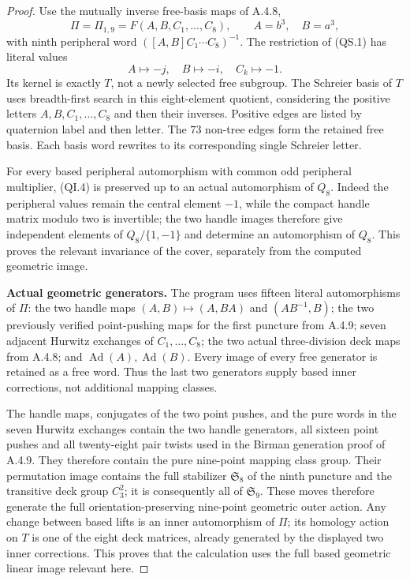 \begin{proof}
Use the mutually inverse free-basis maps of A.4.8,
\[
 \Pi=\Pi_{1,9}=F(A,B,C_1,\ldots,C_8),\qquad
 A=b^3,\quad B=a^3,
\]
with ninth peripheral word
$([A,B]C_1\cdots C_8)^{-1}$.  The restriction of (QS.1)
has literal values
\[
 A\mapsto-j,\quad B\mapsto-i,\quad C_k\mapsto-1.
                                                        \tag{QI.4}
\]
Its kernel is exactly $T$, not a newly selected free
subgroup.  The Schreier basis of $T$ uses breadth-first
search in this eight-element quotient, considering the
positive letters $A,B,C_1,\ldots,C_8$ and then their
inverses.  Positive edges are listed by quaternion label
and then letter.  The $73$ non-tree edges form the retained
free basis.  Each basis word rewrites to its corresponding
single Schreier letter.

For every based peripheral automorphism with common
odd peripheral multiplier, (QI.4) is preserved up to
an actual automorphism of $Q_8$.  Indeed the peripheral
values remain the central element $-1$, while the
compact handle matrix modulo two is invertible; the
two handle images therefore give independent elements
of $Q_8/\{1,-1\}$ and determine an automorphism of
$Q_8$.  This proves the relevant invariance of the
cover, separately from the computed geometric image.

\textbf{Actual geometric generators.}
The program uses fifteen literal automorphisms of $\Pi$:
the two handle maps $(A,B)\mapsto(A,BA)$ and
$(AB^{-1},B)$; the two previously verified point-pushing
maps for the first puncture from A.4.9; seven adjacent
Hurwitz exchanges of $C_1,\ldots,C_8$; the two actual
three-division deck maps from A.4.8; and
$\operatorname{Ad}(A),\operatorname{Ad}(B)$.
Every image of every free generator is retained as a
free word.  Thus the last two generators supply based
inner corrections, not additional mapping classes.

The handle maps, conjugates of the two point pushes,
and the pure words in the seven Hurwitz exchanges
contain the two handle generators, all sixteen point
pushes and all twenty-eight pair twists used in the
Birman generation proof of A.4.9.  They therefore contain
the pure nine-point mapping class group.  Their permutation
image contains the full stabilizer $\mathfrak S_8$ of
the ninth puncture and the transitive deck group $C_3^2$;
it is consequently all of $\mathfrak S_9$.  These moves
therefore generate the full orientation-preserving
nine-point geometric outer action.  Any change between
based lifts is an inner automorphism of $\Pi$; its
homology action on $T$ is one of the eight deck matrices,
already generated by the displayed two inner corrections.
This proves that the calculation uses the full based
geometric linear image relevant here.


\end{proof}
